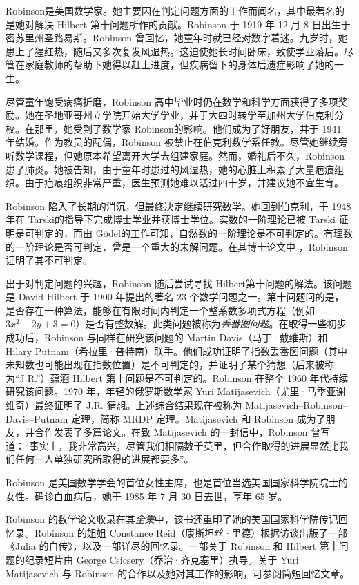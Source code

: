 \documentclass[../../../include/open-logic-section]{subfiles}
\begin{document}



Robinson是美国数学家。她主要因在判定问题方面的工作而闻名，其中最著名的是她对解决 Hilbert 第十问题所作的贡献。Robinson 于 1919 年 12 月 8 日出生于密苏里州圣路易斯。Robinson 曾回忆，她童年时就已经对数字着迷\citep[4]{Reid1986}。九岁时，她患上了猩红热，随后又多次复发风湿热。这迫使她长时间卧床，致使学业落后。尽管在家庭教师的帮助下她得以赶上进度，但疾病留下的身体后遗症影响了她的一生。

尽管童年饱受病痛折磨，Robinson 高中毕业时仍在数学和科学方面获得了多项奖励。她在圣地亚哥州立学院开始大学学业，并于大四时转学至加州大学伯克利分校。在那里，她受到了数学家 Robinson的影响。他们成为了好朋友，并于 1941 年结婚。作为教员的配偶，Robinson 被禁止在伯克利数学系任教。尽管她继续旁听数学课程，但她原本希望离开大学去组建家庭。然而，婚礼后不久，Robinson 患了肺炎。她被告知，由于童年时患过的风湿热，她的心脏上积累了大量疤痕组织。由于疤痕组织非常严重，医生预测她难以活过四十岁，并建议她不宜生育\citep[13]{Reid1986}。

Robinson 陷入了长期的消沉，但最终决定继续研究数学。她回到伯克利，于 1948 年在 Tarski的指导下完成博士学业并获博士学位。实数的一阶理论已被 Tarski 证明是可判定的，而由 Gödel的工作可知，自然数的一阶理论是不可判定的。有理数的一阶理论是否可判定，曾是一个重大的未解问题。在其博士论文中 \citeyearpar{Robinson1949}，Robinson 证明了其不可判定。

出于对判定问题的兴趣，Robinson 随后尝试寻找 Hilbert第十问题的解法。该问题是 David Hilbert 于 1900 年提出的著名 23 个数学问题之一。第十问题问的是，是否存在一种算法，能够在有限时间内判定一个整系数多项式方程（例如 $3x^2 - 2y +3 = 0$）是否有整数解。此类问题被称为\emph{丢番图问题}。在取得一些初步成功后，Robinson 与同样在研究该问题的 Martin Davis（马丁·戴维斯）和 Hilary Putnam（希拉里·普特南）联手。他们成功证明了指数丢番图问题（其中未知数也可能出现在指数位置）是不可判定的，并证明了某个猜想（后来被称为“J.R.”）蕴涵 Hilbert 第十问题是不可判定的\citep{DavisPutnamRobinson1961}。Robinson 在整个 1960 年代持续研究该问题。1970 年，年轻的俄罗斯数学家 Yuri Matijasevich（尤里·马季亚谢维奇）最终证明了 J.R. 猜想。上述综合结果现在被称为 Matijasevich--Robinson--Davis--Putnam 定理，简称 MRDP 定理。Matijasevich 和 Robinson 成为了朋友，并合作发表了多篇论文。在致 Matijasevich 的一封信中，Robinson 曾写道：“事实上，我非常高兴，尽管我们相隔数千英里，但合作取得的进展显然比我们任何一人单独研究所取得的进展都要多”\citep[45]{Matijasevich1992}。

Robinson 是美国数学学会的首位女性主席，也是首位当选美国国家科学院院士的女性。确诊白血病后，她于 1985 年 7 月 30 日去世，享年 65 岁。

\begin{reading}
Robinson 的数学论文收录在其\emph{全集}\citep{Robinson1996}中，该书还重印了她的美国国家科学院传记回忆录\citep{Feferman1994}。Robinson 的姐姐 Constance Reid（康斯坦丝·里德）根据访谈出版了一部《Julia 的自传》\citep{Reid1986}，以及一部详尽的回忆录\citep{Reid1996}。一部关于 Robinson 和 Hilbert 第十问题的纪录短片由 George Csicsery（乔治·齐克塞里）执导\citep{Csicsery2016}。关于 Yuri Matijasevich 与 Robinson 的合作以及她对其工作的影响，可参阅简短回忆文章\citep{Matijasevich1992}。
\end{reading}
\end{document}
